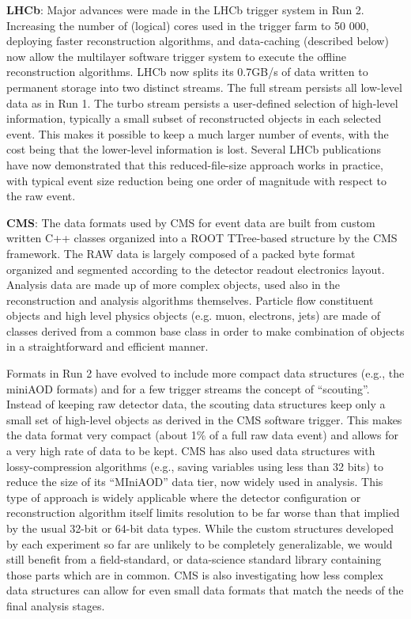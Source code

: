 \vskip 0.5cm
\noindent
{\bf LHCb}: Major advances were made in the LHCb trigger system in Run 2. Increasing the number of (logical) cores used in the trigger farm to 50 000, deploying faster reconstruction algorithms, and data-caching (described below) now allow the multilayer software trigger system to execute the offline reconstruction algorithms. LHCb now splits its 0.7GB/s of data written to permanent storage into two distinct streams. The full stream persists all low-level data as in Run 1. The turbo stream persists a user-defined selection of high-level information, typically a small subset of reconstructed objects in each selected event. This makes it possible to keep a much larger number of events, with the cost being that the lower-level information is lost. Several LHCb publications have now demonstrated that this reduced-file-size approach works in practice, with typical event size reduction being one order of magnitude with respect to the raw event. 

\vskip 0.5cm
\noindent
{\bf CMS}: The data formats used by CMS for event data are built from custom written C++ classes organized into a ROOT TTree-based structure by the CMS framework. The RAW data is largely composed of a packed byte format organized and segmented according to the detector readout electronics layout. Analysis data are made up of more complex objects, used also in the reconstruction and analysis algorithms themselves. Particle flow constituent objects and high level physics objects (e.g. muon, electrons, jets) are made of classes derived from a common base class in order to make combination of objects in a straightforward and efficient manner.

Formats in Run 2 have evolved to include more compact data structures (e.g., the miniAOD formats) and for a few trigger streams the concept of “scouting”. Instead of keeping raw detector data, the scouting data structures keep only a small set of high-level objects as derived in the CMS software trigger. This makes the data format very compact (about 1\% of a full raw data event) and allows for a very high rate of data to be kept. CMS has also used data structures with lossy-compression algorithms (e.g., saving variables using less than 32 bits) to reduce the size of its “MIniAOD” data tier, now widely used in analysis. This type of approach is widely applicable where the detector configuration or reconstruction algorithm itself limits resolution to be far worse than that implied by the usual 32-bit or 64-bit data types. While the custom structures developed by each experiment so far are unlikely to be completely generalizable, we would still benefit from a field-standard, or data-science standard library containing those parts which are in common.  CMS is also investigating how less complex data structures can allow for even small data formats that match the needs of the final analysis stages.


